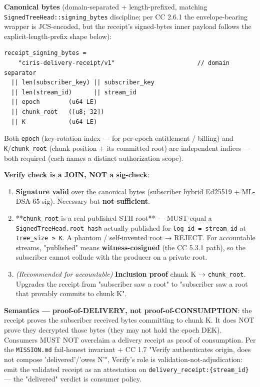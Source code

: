 \documentclass[11pt]{article}
\begin{document}
\textbf{Canonical bytes} (domain-separated + length-prefixed, matching \texttt{SignedTreeHead::signing\_bytes} discipline; per CC 2.6.1 the envelope-bearing wrapper is JCS-encoded, but the receipt's signed-bytes inner payload follows the explicit-length-prefix shape below):


\begin{lstlisting}
receipt_signing_bytes =
    "ciris-delivery-receipt/v1"                       // domain separator
  || len(subscriber_key) || subscriber_key
  || len(stream_id)      || stream_id
  || epoch        (u64 LE)
  || chunk_root   ([u8; 32])
  || K            (u64 LE)
\end{lstlisting}

Both \texttt{epoch} (key-rotation index — for per-epoch entitlement / billing) and \texttt{K}/\texttt{chunk\_root} (chunk position + its committed root) are independent indices — both required (each names a distinct authorization scope).


\textbf{Verify check is a JOIN, NOT a sig-check}:


\begin{enumerate}\setlength\itemsep{0pt}
\item \textbf{Signature valid} over the canonical bytes (subscriber hybrid Ed25519 + ML-DSA-65 sig). Necessary but \textbf{not sufficient}.
\item **\texttt{chunk\_root} is a real published STH root** — MUST equal a \texttt{SignedTreeHead.root\_hash} actually published for \texttt{log\_id = stream\_id} at \texttt{tree\_size ≥ K}. A phantom / self-invented root → REJECT. For accountable streams, "published" means \textbf{witness-cosigned} (the CC 5.3.1 path), so the subscriber cannot collude with the producer on a private root.
\item \textit{(Recommended for accountable)} \textbf{Inclusion proof} chunk K → \texttt{chunk\_root}. Upgrades the receipt from "subscriber saw a root" to "subscriber saw a root that provably commits to chunk K".
\end{enumerate}


\textbf{Semantics — proof-of-DELIVERY, not proof-of-CONSUMPTION}: the receipt proves the subscriber received bytes committing to chunk K. It does NOT prove they decrypted those bytes (they may not hold the epoch DEK). Consumers MUST NOT overclaim a delivery receipt as proof of consumption. Per the \texttt{MISSION.md} fail-honest invariant + CC 1.7 "Verify authenticates origin, does not compose 'delivered'/'owes N'", Verify's role is validation-not-adjudication: emit the validated receipt as an attestation on \texttt{delivery\_receipt:\{stream\_id\}} — the "delivered" verdict is consumer policy.
\end{document}

